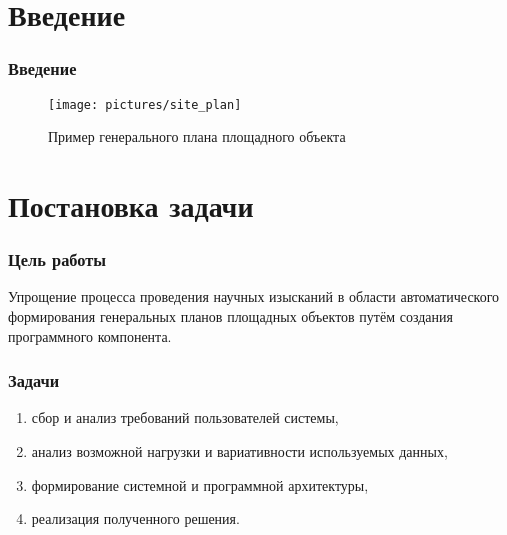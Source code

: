 \section{Введение}

\begin{frame}
\frametitle{Введение}
\begin{figure}
    \texttt{[image: pictures/site\_plan]}
    \caption{Пример генерального плана площадного объекта}
\end{figure}
\end{frame}



\section{Постановка задачи}

\begin{frame}
\frametitle{Цель работы}
Упрощение процесса проведения научных изысканий
в области автоматического формирования генеральных планов площадных объектов
путём создания программного компонента.
\end{frame}


\begin{frame}
\frametitle{Задачи}
\begin{enumerate}
    \item сбор и анализ требований пользователей системы,
    \item анализ возможной нагрузки и вариативности используемых данных,
    \item формирование системной и программной архитектуры,
    \item реализация полученного решения.
\end{enumerate}
\end{frame}
